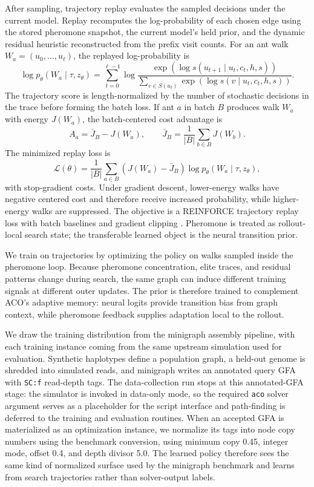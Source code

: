 \documentclass[11pt]{article}
\begin{document}
After sampling, trajectory replay evaluates the sampled decisions under the current model. Replay recomputes the log-probability of each chosen edge using the stored pheromone snapshot, the current model's held prior, and the dynamic residual heuristic reconstructed from the prefix visit counts. For an ant walk $W_a=(u_0,\ldots,u_\ell)$, the replayed log-probability is
\begin{equation}
\log p_\theta(W_a\mid \tau,z_\theta)
=
\sum_{t=0}^{\ell-1}
\log
\frac{\exp(\log s(u_{t+1}\mid u_t,c_t,h,s))}
{\sum_{v\in S(u_t)}
\exp(\log s(v\mid u_t,c_t,h,s))}.
\label{eq:replay-logp}
\end{equation}
The trajectory score is length-normalized by the number of stochastic decisions in the trace before forming the batch loss. If ant $a$ in batch $B$ produces walk $W_a$ with energy $J(W_a)$, the batch-centered cost advantage is
\begin{equation}
A_a=\bar J_B-J(W_a),
\qquad
\bar J_B=\frac{1}{|B|}\sum_{b\in B}J(W_b).
\end{equation}
The minimized replay loss is
\begin{equation}
\mathcal L(\theta)
=
\frac{1}{|B|}\sum_{a\in B}
\left(J(W_a)-\bar J_B\right)
\log p_\theta(W_a\mid \tau,z_\theta),
\label{eq:policy-loss}
\end{equation}
with stop-gradient costs. Under gradient descent, lower-energy walks have negative centered cost and therefore receive increased probability, while higher-energy walks are suppressed. The objective is a REINFORCE trajectory replay loss with batch baselines and gradient clipping \citep{williams1992reinforce}. Pheromone is treated as rollout-local search state; the transferable learned object is the neural transition prior.

We train on trajectories by optimizing the policy on walks sampled inside the pheromone loop. Because pheromone concentration, elite traces, and residual patterns change during search, the same graph can induce different training signals at different outer updates. The prior is therefore trained to complement ACO's adaptive memory: neural logits provide transition bias from graph context, while pheromone feedback supplies adaptation local to the rollout.

We draw the training distribution from the minigraph assembly pipeline, with each training instance coming from the same upstream simulation used for evaluation. Synthetic haplotypes define a population graph, a held-out genome is shredded into simulated reads, and minigraph writes an annotated query GFA with \texttt{SC:f} read-depth tags. The data-collection run stops at this annotated-GFA stage: the simulator is invoked in data-only mode, so the required \texttt{aco} solver argument serves as a placeholder for the script interface and path-finding is deferred to the training and evaluation routines. When an accepted GFA is materialized as an optimization instance, we normalize its tags into node copy numbers using the benchmark conversion, using minimum copy 0.45, integer mode, offset 0.4, and depth divisor 5.0. The learned policy therefore sees the same kind of normalized surface used by the minigraph benchmark and learns from search trajectories rather than solver-output labels.
\end{document}
